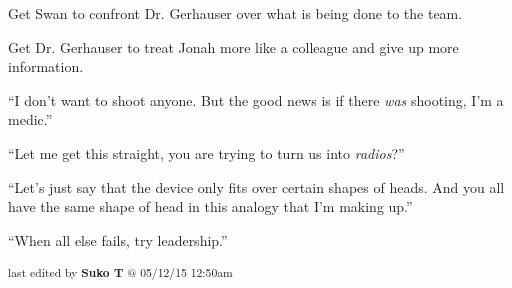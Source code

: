 Get Swan to confront Dr. Gerhauser over what is being done to the team.


Get Dr. Gerhauser to treat Jonah more like a colleague and give up more information.






 ``I don't want to shoot anyone.  But the good news is if there \textit{was} shooting, I'm a medic.''


``Let me get this straight, you are trying to turn us into \textit{radios}?''




``Let's just say that the device only fits over certain shapes of heads.  And you all have the same shape of head in this analogy that I'm making up.''




``When all else fails, try leadership.''


\vspace{\fill}

\begin{flushright}
\textsubscript{last edited by \textbf{Suko T} @ 05/12/15 12:50am}
\end{flushright}

